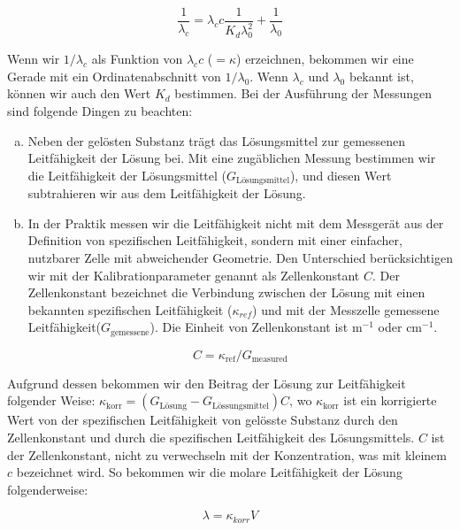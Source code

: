 \begin{equation}
\label{eq:ostwald2}
        \frac{1}{\lambda_c}
        =
	\lambda_c
	c
	\frac{1}{K_d \lambda_0^2}
	+\frac{1}{\lambda_0}
\end{equation}

Wenn wir $1/\lambda_c$ als Funktion von $\lambda_c c$ ($= \kappa$) erzeichnen, bekommen wir eine Gerade mit ein Ordinatenabschnitt von $1/\lambda_0$. 
Wenn $\lambda_c$ und $\lambda_0$ bekannt ist, können wir auch den Wert $K_d$ bestimmen.
Bei der Ausführung der Messungen sind folgende Dingen zu beachten: 

\begin{enumerate}[(a)]
\item Neben der gelösten Substanz trägt das Lösungsmittel zur gemessenen Leitfähigkeit der Lösung bei.
Mit eine zugäblichen Messung bestimmen wir die Leitfähigkeit der Lösungsmittel ($G_{\text{Lösungsmittel}}$), und diesen Wert subtrahieren wir aus dem Leitfähigkeit der Lösung.

\item In der Praktik messen wir die Leitfähigkeit nicht mit dem Messgerät aus der Definition von spezifischen Leitfähigkeit, sondern mit einer einfacher, nutzbarer Zelle mit abweichender Geometrie.
Den Unterschied berücksichtigen wir mit der Kalibrationparameter genannt als Zellenkonstant $C$.
Der Zellenkonstant bezeichnet die Verbindung zwischen der Lösung mit einen bekannten spezifischen Leitfähigkeit ($\kappa_{ref}$) und mit der Messzelle gemessene Leitfähigkeit($G_{\text{gemessene}}$). Die Einheit von Zellenkonstant ist m$^{-1}$ oder cm$^{-1}$.

\begin{equation}
\label{eq:c}
	C
	=
	\kappa_{\text{ref}}/G_{\text{measured}}
\end{equation}

\end{enumerate}

Aufgrund dessen bekommen wir den Beitrag der Lösung zur Leitfähigkeit folgender Weise: $\kappa_{\text{korr}} = (G_{\text{Lösung}} - G_{\text{Lössungsmittel}})C$,
wo $\kappa_{\text{korr}}$ ist ein korrigierte Wert von der spezifischen Leitfähigkeit von gelösste Substanz durch den Zellenkonstant und durch die spezifischen Leitfähigkeit des Lösungsmittels. 
$C$ ist der Zellenkonstant, nicht zu verwechseln mit der Konzentration, was mit kleinem $c$ bezeichnet wird.
So bekommen wir die molare Leitfähigkeit der Lösung folgenderweise:

\begin{equation}
\label{eq:c}
        \lambda
        =
        \kappa_{korr}
	V
\end{equation}

